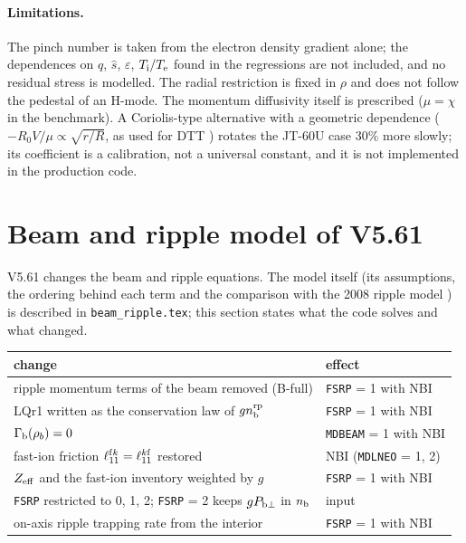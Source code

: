 \documentclass[11pt]{article}
\def\r#1{{\rm#1}}
\def\nb{n_\r{b}}
\def\nbrp{n_\r{b}^\r{rp}}
\begin{document}
\paragraph{Limitations.}  The pinch number is taken from the electron density gradient
alone; the dependences on $q$, $\hat{s}$, $\varepsilon$, $T_\r{i}/T_\r{e}$ found in
the regressions are not included, and no residual stress is modelled.  The radial
restriction is fixed in $\rho$ and does not follow the pedestal of an H-mode.  The
momentum diffusivity itself is prescribed ($\mu = \chi$ in the benchmark).  A
Coriolis-type alternative with a geometric dependence ($-R_0V/\mu\propto\sqrt{r/R}$, as
used for DTT \cite{Casiraghi2021}) rotates the JT-60U case 30\% more slowly; its
coefficient is a calibration, not a universal constant, and it is not implemented in
the production code.


\section{Beam and ripple model of V5.61}
\setcounter{equation}{0}
\label{sec:v561}

V5.61 changes the beam and ripple equations.  The model itself (its
assumptions, the ordering behind each term and the comparison with the 2008
ripple model \cite{NF2008}) is described in \texttt{beam\_ripple.tex}; this
section states what the code solves and what changed.

\begin{center}
\begin{tabular}{|l|l|}\hline
change & effect \\\hline
ripple momentum terms of the beam removed (B-full) & \texttt{FSRP} = 1 with NBI \\
LQr1 written as the conservation law of $g\nbrp$ & \texttt{FSRP} = 1 with NBI \\
$\Gamma_\r{b}(\rho_b) = 0$ & \texttt{MDBEAM} = 1 with NBI \\
fast-ion friction $\ell_{11}^{\r{f}k} = \ell_{11}^{k\r{f}}$ restored & NBI (\texttt{MDLNEO} = 1, 2) \\
$Z_\r{eff}$ and the fast-ion inventory weighted by $g$ & \texttt{FSRP} = 1 with NBI \\
\texttt{FSRP} restricted to 0, 1, 2; \texttt{FSRP} = 2 keeps $g P_{\r{b}\perp}$ in $\nb$ & input \\
on-axis ripple trapping rate from the interior & \texttt{FSRP} = 1 with NBI \\\hline
\end{tabular}
\end{center}
\end{document}
